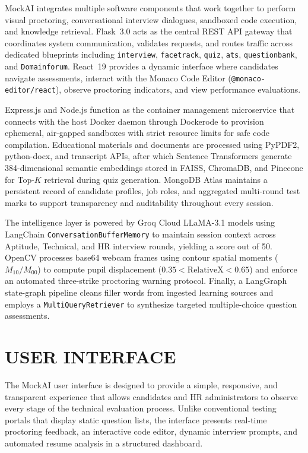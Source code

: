 \documentclass[12pt,a4paper]{report}
\begin{document}
MockAI integrates multiple software components that work together to perform visual
proctoring, conversational interview dialogues, sandboxed code execution, and knowledge
retrieval. Flask~3.0 acts as the central REST API gateway that coordinates system
communication, validates requests, and routes traffic across dedicated blueprints including
\texttt{interview}, \texttt{facetrack}, \texttt{quiz}, \texttt{ats}, \texttt{questionbank},
and \texttt{Domainforum}. React~19 provides a dynamic interface where candidates navigate
assessments, interact with the Monaco Code Editor (\texttt{@monaco-editor/react}), observe
proctoring indicators, and view performance evaluations.

Express.js and Node.js function as the container management microservice that connects
with the host Docker daemon through Dockerode to provision ephemeral, air-gapped
sandboxes with strict resource limits for safe code compilation. Educational materials and
documents are processed using PyPDF2, python-docx, and transcript APIs, after which
Sentence Transformers generate 384-dimensional semantic embeddings stored in FAISS,
ChromaDB, and Pinecone for Top-$K$ retrieval during quiz generation. MongoDB Atlas
maintains a persistent record of candidate profiles, job roles, and aggregated multi-round
test marks to support transparency and auditability throughout every session.

The intelligence layer is powered by Groq Cloud LLaMA-3.1 models using LangChain
\texttt{ConversationBufferMemory} to maintain session context across Aptitude, Technical,
and HR interview rounds, yielding a score out of 50. OpenCV processes base64 webcam
frames using contour spatial moments ($M_{10}/M_{00}$) to compute pupil displacement
($0.35 < \text{RelativeX} < 0.65$) and enforce an automated three-strike proctoring
warning protocol. Finally, a LangGraph state-graph pipeline cleans filler words from
ingested learning sources and employs a \texttt{MultiQueryRetriever} to synthesize
targeted multiple-choice question assessments.

\section{USER INTERFACE}

The MockAI user interface is designed to provide a simple, responsive, and transparent
experience that allows candidates and HR administrators to observe every stage of the
technical evaluation process. Unlike conventional testing portals that display static
question lists, the interface presents real-time proctoring feedback, an interactive code
editor, dynamic interview prompts, and automated resume analysis in a structured
dashboard.
\end{document}
